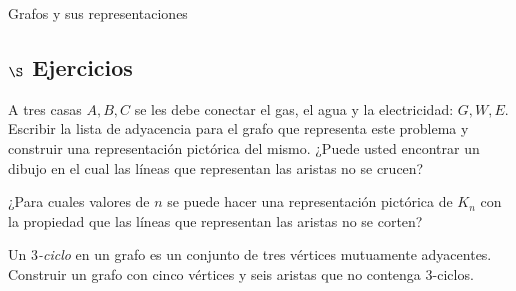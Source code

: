 \begin{section}{Grafos y sus representaciones}
\subsection*{$\S$ Ejercicios}
\begin{enumex}
\item A tres casas $A,B,C$ se les debe conectar el gas, el agua y la electricidad: $G,W,E$. Escribir la lista de adyacencia para el grafo que representa este problema y construir una representación pictórica del mismo. ¿Puede usted encontrar un dibujo en el cual las líneas que representan las aristas no se crucen?
\item  ¿Para cuales valores de $n$ se puede hacer una representación pictórica
de $K_n$ con la propiedad que las líneas que representan las aristas no se corten? 
\item Un \textit{{$3$-ciclo}} en un grafo es un conjunto de tres vértices mutuamente adyacentes. Construir un grafo con cinco vértices y seis aristas que no contenga $3$-ciclos.
\end{enumex}

\end{section}


